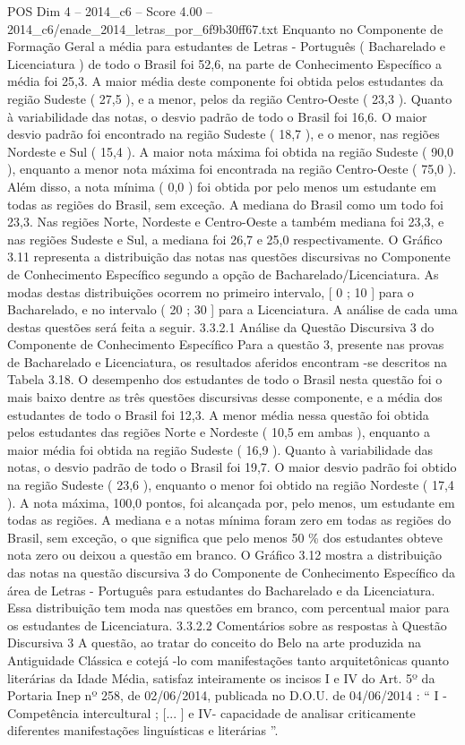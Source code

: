 \begin{textsample}{POS Dim 4 – 2014\_c6 – Score 4.00 – 2014\_c6/enade\_2014\_letras\_por\_6f9b30ff67.txt}
Enquanto no Componente de Formação Geral a média para estudantes de Letras - Português ( Bacharelado e Licenciatura ) de todo o Brasil foi 52,6, na parte de Conhecimento Específico a média foi 25,3.
A maior média deste componente foi obtida pelos estudantes da região Sudeste ( 27,5 ), e a menor, pelos da região Centro-Oeste ( 23,3 ).
Quanto à variabilidade das notas, o desvio padrão de todo o Brasil foi 16,6.
O maior desvio padrão foi encontrado na região Sudeste ( 18,7 ), e o menor, nas regiões Nordeste e Sul ( 15,4 ).
A maior nota máxima foi obtida na região Sudeste ( 90,0 ), enquanto a menor nota máxima foi encontrada na região Centro-Oeste ( 75,0 ).
Além disso, a nota mínima ( 0,0 ) foi obtida por pelo menos um estudante em todas as regiões do Brasil, sem exceção.
A mediana do Brasil como um todo foi 23,3.
Nas regiões Norte, Nordeste e Centro-Oeste a também mediana foi 23,3, e nas regiões Sudeste e Sul, a mediana foi 26,7 e 25,0 respectivamente.
O Gráfico 3.11 representa a distribuição das notas nas questões discursivas no Componente de Conhecimento Específico segundo a opção de Bacharelado/Licenciatura.
As modas destas distribuições ocorrem no primeiro intervalo, [ 0 ; 10 ] para o Bacharelado, e no intervalo ( 20 ; 30 ] para a Licenciatura.
A análise de cada uma destas questões será feita a seguir. 3.3.2.1 Análise da Questão Discursiva 3 do Componente de Conhecimento Específico Para a questão 3, presente nas provas de Bacharelado e Licenciatura, os resultados aferidos encontram -se descritos na Tabela 3.18.
O desempenho dos estudantes de todo o Brasil nesta questão foi o mais baixo dentre as três questões discursivas desse componente, e a média dos estudantes de todo o Brasil foi 12,3.
A menor média nessa questão foi obtida pelos estudantes das regiões Norte e Nordeste ( 10,5 em ambas ), enquanto a maior média foi obtida na região Sudeste ( 16,9 ).
Quanto à variabilidade das notas, o desvio padrão de todo o Brasil foi 19,7.
O maior desvio padrão foi obtido na região Sudeste ( 23,6 ), enquanto o menor foi obtido na região Nordeste ( 17,4 ).
A nota máxima, 100,0 pontos, foi alcançada por, pelo menos, um estudante em todas as regiões.
A mediana e a notas mínima foram zero em todas as regiões do Brasil, sem exceção, o que significa que pelo menos 50 \% dos estudantes obteve nota zero ou deixou a questão em branco.
O Gráfico 3.12 mostra a distribuição das notas na questão discursiva 3 do Componente de Conhecimento Específico da área de Letras - Português para estudantes do Bacharelado e da Licenciatura.
Essa distribuição tem moda nas questões em branco, com percentual maior para os estudantes de Licenciatura. 3.3.2.2 Comentários sobre as respostas à Questão Discursiva 3 A questão, ao tratar do conceito do Belo na arte produzida na Antiguidade Clássica e cotejá -lo com manifestações tanto arquitetônicas quanto literárias da Idade Média, satisfaz inteiramente os incisos I e IV do Art. 5º da Portaria Inep nº 258, de 02/06/2014, publicada no D.O.U. de 04/06/2014 : “ I - Competência intercultural ; [... ] e IV- capacidade de analisar criticamente diferentes manifestações linguísticas e literárias ”.

\end{textsample}
